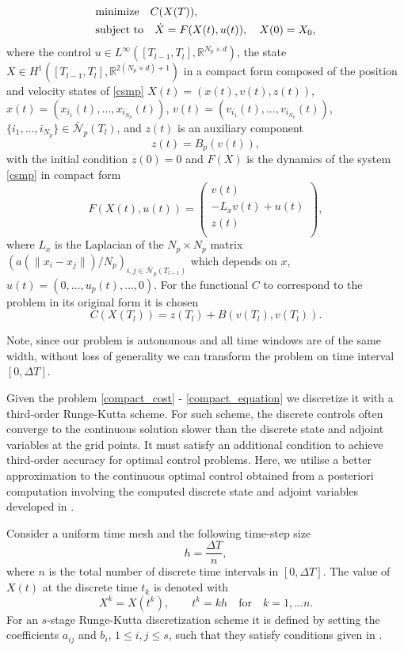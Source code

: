 \documentclass[a4paper, english]{article}
\newcommand{\D}{\displaystyle}
\begin{document}
 \begin{align}
 \D
 & \mbox{minimize}\quad  C(X(T)),   \label{compact_cost} \\
 & \mbox{subject to} \quad \dot{X} = F(X(t), u(t)), \quad X(0) = X_0, \label{compact_equation}
 \end{align}
where  the control $u \in  L^{\infty}([T_{l-1}, T_{l}], \mathbb{R}^{N_p \times d})$,
the state $X\in H^1([T_{l-1}, T_{l}], \mathbb{R}^{2(N_p \times d)+1})$
in a compact form composed of the position and velocity
states of \eqref{csmp}   $X(t) = (x(t), v(t), z(t))$, $x(t) = (x_{i_1}(t), \dots, x_{i_{N_p}}(t))$,
 $v(t) = (v_{i_1}(t), \dots, v_{i_{N_p}}(t))$, $\{i_1, \dots, i_{N_p}\} \in \bar{\mathcal{N}}_p(T_l)$,
 and $z(t)$ is an auxiliary component
 $$
 z(t) =  B_p(v(t)),
 $$
 with the initial condition $z(0) = 0$ and $F(X)$ is the dynamics of the system \eqref{csmp} in compact form
 $$
 F(X(t), u(t)) =
  \left(
  \begin{array}{c}
  v(t)\\
   - L_xv(t) + u(t)\\
   z(t)\\
 \end{array}
 \right),
 $$
 where $L_x$ is the Laplacian of the $N_p\times N_p$ matrix $(a(\|x_i - x_j\|)/N_p)_{i, j\in\bar{\mathcal{N}}_p(T_{l-1})}$ which depends on $x$, $u(t) = (0, \dots, u_p(t), \dots, 0)$.
 For the functional $C$ to correspond to the problem in its original form it is chosen
 $$
 C(X(T_l)) = z(T_l) + B(v(T_l), v(T_l)).
 $$

  Note, since our problem is autonomous and all time windows are of the same width, without loss of generality
 we can transform the problem on time interval $[0, \Delta T]$.



  Given the problem \eqref{compact_cost} - \eqref{compact_equation} we discretize it with a third-order Runge-Kutta scheme.  For such scheme, the discrete controls often converge to the continuous solution slower than the discrete state and adjoint variables at the grid points. It  must satisfy an additional condition to achieve third-order accuracy
    for optimal control problems. Here, we utilise a better approximation to the continuous optimal control obtained from a posteriori computation involving the computed discrete state and adjoint variables  developed in \cite{Hager2000}.

  Consider a uniform time mesh and the following time-step size
 \begin{equation}
   h = \frac{\Delta T}{n},
   \label{h}
 \end{equation}
 where $n$ is the total number of discrete time intervals in $[0, \Delta T]$.  The value of $X(t)$ at the discrete time $t_k$ is denoted with
 $$
 X^k = X(t^k), \qquad t^k = kh \quad\mbox{for} \quad k = 1, \dots n.
 $$
 For an $s$-stage Runge-Kutta discretization scheme it is defined by setting the coefficients $a_{ij}$ and
 $b_{i}$, $1\leq i, j\leq s$, such that they satisfy conditions given in \cite{Hager2000}.
\end{document}
